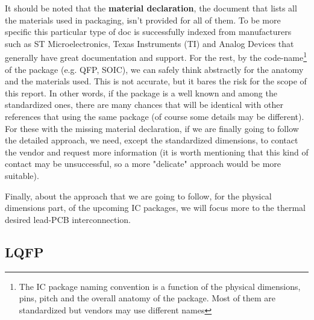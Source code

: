 \documentclass[final]{cubedoc}
\begin{document}
	It should be noted that the \textbf{material declaration}, the document that lists all the materials used in packaging, isn't provided for all of them. To be more specific this particular type of doc is successfully indexed from manufacturers such as ST Microelectronics, Texas Instruments (TI) and Analog Devices that generally have great documentation and support. For the rest, by the code-name\footnote{The IC package naming convention is a function of the physical dimensions, pins, pitch and the overall anatomy of the package. Most of them are standardized but vendors may use different names} of the package (e.g. QFP, SOIC), we can safely think abstractly for the anatomy and the materials used. This is not accurate, but it bares the risk for the scope of this report. In other words, if the package is a well known and among the standardized ones, there are many chances that will be identical with other references that using the same package (of course some details may be different). For these with the missing material declaration, if we are finally going to follow the detailed approach, we need, except the standardized dimensions, to contact the vendor and request more information (it is worth mentioning that this kind of contact may be unsuccessful, so a more "delicate" approach would be more suitable). 
	
	Finally, about the approach that we are going to follow, for the physical dimensions part, of the upcoming IC packages, we will focus more to the thermal desired lead-PCB interconnection.
	
	
	\subsection{LQFP}
	
\end{document}
